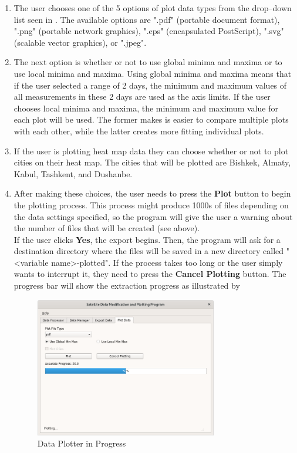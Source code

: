 \documentclass[../00_main.tex]{subfiles}
\begin{document}
\begin{enumerate}
    \item The user chooses one of the 5 options of plot data
        types from the drop--down list seen in . The available
        options are ".pdf" (portable document format), ".png" (portable network 
        graphics), ".eps" (encapsulated PostScript), ".svg" (scalable vector 
        graphics), or ".jpeg". 
    \item The next option is whether or not to use global minima and maxima or
        to use local minima and maxima. Using global minima and maxima means
        that if the user selected a range of 2 days, the minimum and maximum 
        values of all measurements in these 2 days are used as the axis limits.
        If the user chooses local minima and maxima, the minimum and maximum
        value for each plot will be used. The former makes is easier
        to compare multiple plots with each other, while the latter creates
        more fitting individual plots.
    \item If the user is plotting heat map data they can choose whether or not
        to plot cities on their heat map. The cities that will be plotted are
        Bishkek, Almaty, Kabul, Tashkent, and Dushanbe.
    \item After making these choices, the user needs to press the
        \textbf{Plot} button to begin the plotting process. This
        process might produce 1000s of files depending on the data settings
        specified, so the program will give the user a warning about the number 
        of files that will be created (see  above).\\
        If the user clicks \textbf{Yes}, the export begins. Then, the program 
        will ask for a destination directory where the files will be saved in a 
        new directory called "<variable name>-plotted". If the process takes 
        too long or the user simply wants to interrupt it, they need to press 
        the \textbf{Cancel Plotting} button. The progress bar will show the
        extraction progress as illustrated by 
        \begin{figure}[H]
            \center
            \includegraphics[width=0.75\textwidth]{../graphics/dpl03}
            \caption{Data Plotter in Progress}
            \label{dpl03}
        \end{figure}
\end{enumerate}
\end{document}
